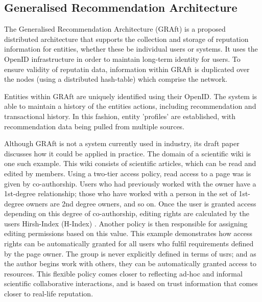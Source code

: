 
\subsection{Generalised Recommendation Architecture}

The Generalised Recommendation Architecture (GRAft) \cite{} is a proposed distributed architecture that supports the collection and storage of reputation information for entities, whether these be individual users or systems. It uses the OpenID \cite{} infrastructure in order to maintain long-term identity for users. To ensure validity of reputatin data, information within GRAft is duplicated over the nodes (using a distributed hash-table) which comprise the network. 

Entities within GRAft are uniquely identified using their OpenID. The system is able to maintain a history of the entities actions, including recommendation and transactional history. In this fashion, entity 'profiles' are established, with recommendation data being pulled from multiple sources.



Although GRAft is not a system currently used in industry, its draft paper discusses how it could be applied in practice. The domain of a scientific wiki is one such example. This wiki consists of scientific articles, which can be read and edited by members. Using a two-tier access policy, read access to a page was is given by co-authorship. Users who had previously worked with the owner have a 1st-degree relationship; those who have worked with a person in the set of 1st-degree owners are 2nd degree owners, and so on. Once the user is granted access depending on this degree of co-authorship, editing rights are calculated by the users Hirsh-Index (H-Index) \cite{}. Another policy is then responsible for assigning editing permissions based on this value. This example demonstrates how access rights can be automatically granted for all users who fulfil requirements defined by the page owner. The group is never explicitly defined in terms of usrs; and as the author begins work with others, they can be 
automatically granted access to resources. This flexible policy comes closer to reflecting ad-hoc and informal scientific collaborative interactions, and is based on trust information that comes closer to real-life reputation. 

